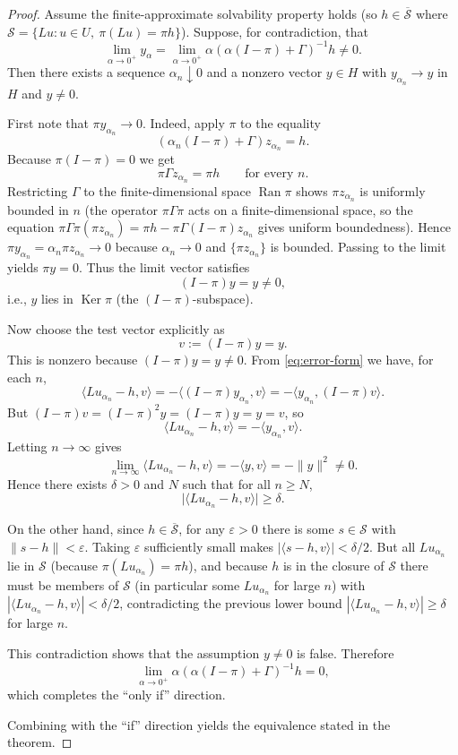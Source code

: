 \documentclass[12pt]{article}
\DeclareMathOperator{\Ran}{Ran}
\DeclareMathOperator{\Ker}{Ker}
\begin{document}
\begin{proof}
		Assume the finite-approximate solvability property holds (so \(h \in \overline{\mathcal S}\) where \(\mathcal S = \{Lu: u \in U,\ \pi(Lu)=\pi h\}\)). Suppose, for contradiction, that
		\[
		\lim_{\alpha\to0^+} y_\alpha = \lim_{\alpha\to0^+} \alpha(\alpha(I-\pi)+\Gamma)^{-1}h \neq 0.
		\]
		Then there exists a sequence \(\alpha_n \downarrow 0\) and a nonzero vector \(y \in H\) with \(y_{\alpha_n} \to y\) in \(H\) and \(y \ne 0\).
		
		First note that \(\pi y_{\alpha_n} \to 0\). Indeed, apply \(\pi\) to the equality
		\[
		(\alpha_n(I-\pi)+\Gamma) z_{\alpha_n} = h.
		\]
		Because \(\pi(I-\pi)=0\) we get
		\[
		\pi\Gamma z_{\alpha_n} = \pi h \qquad\text{for every }n.
		\]
		Restricting \(\Gamma\) to the finite-dimensional space \(\Ran \pi\) shows \(\pi z_{\alpha_n}\) is uniformly bounded in \(n\) (the operator \(\pi\Gamma\pi\) acts on a finite-dimensional space, so the equation \(\pi\Gamma\pi(\pi z_{\alpha_n}) = \pi h - \pi\Gamma(I-\pi)z_{\alpha_n}\) gives uniform boundedness). Hence \(\pi y_{\alpha_n} = \alpha_n \pi z_{\alpha_n} \to 0\) because \(\alpha_n \to 0\) and \(\{\pi z_{\alpha_n}\}\) is bounded. Passing to the limit yields \(\pi y = 0\). Thus the limit vector satisfies
		\[
		(I-\pi)y = y \neq 0,
		\]
		i.e., \(y\) lies in \(\Ker \pi\) (the \((I-\pi)\)-subspace).
		
		Now choose the test vector explicitly as
		\[
		v := (I-\pi)y = y.
		\]
		This is nonzero because \((I-\pi)y = y \neq 0\). From \eqref{eq:error-form} we have, for each \(n\),
		\[
		\langle Lu_{\alpha_n}-h, v\rangle = -\langle (I-\pi)y_{\alpha_n}, v\rangle = -\langle y_{\alpha_n}, (I-\pi)v\rangle.
		\]
		But \((I-\pi)v = (I-\pi)^2 y = (I-\pi)y = y = v\), so
		\[
		\langle Lu_{\alpha_n}-h, v\rangle = -\langle y_{\alpha_n}, v\rangle.
		\]
		Letting \(n \to \infty\) gives
		\[
		\lim_{n\to\infty}\langle Lu_{\alpha_n}-h, v\rangle = -\langle y, v\rangle = -\|y\|^2 \neq 0.
		\]
		Hence there exists \(\delta > 0\) and \(N\) such that for all \(n \ge N\),
		\[
		\big|\langle Lu_{\alpha_n}-h, v\rangle\big| \ge \delta.
		\]
		
		On the other hand, since \(h \in \overline{\mathcal S}\), for any \(\varepsilon > 0\) there is some \(s \in \mathcal S\) with \(\|s-h\| < \varepsilon\). Taking \(\varepsilon\) sufficiently small makes \(|\langle s-h, v\rangle| < \delta/2\). But all \(Lu_{\alpha_n}\) lie in \(\mathcal S\) (because \(\pi(Lu_{\alpha_n}) = \pi h\)), and because \(h\) is in the closure of \(\mathcal S\) there must be members of \(\mathcal S\) (in particular some \(Lu_{\alpha_n}\) for large \(n\)) with \(|\langle Lu_{\alpha_n}-h, v\rangle| < \delta/2\), contradicting the previous lower bound \(|\langle Lu_{\alpha_n}-h, v\rangle| \ge \delta\) for large \(n\).
		
		This contradiction shows that the assumption \(y \ne 0\) is false. Therefore
		\[
		\lim_{\alpha\to0^+}\alpha(\alpha(I-\pi)+\Gamma)^{-1}h = 0,
		\]
		which completes the ``only if'' direction.
		
		Combining with the ``if'' direction yields the equivalence stated in the theorem.
	\end{proof}
	
\end{document}
